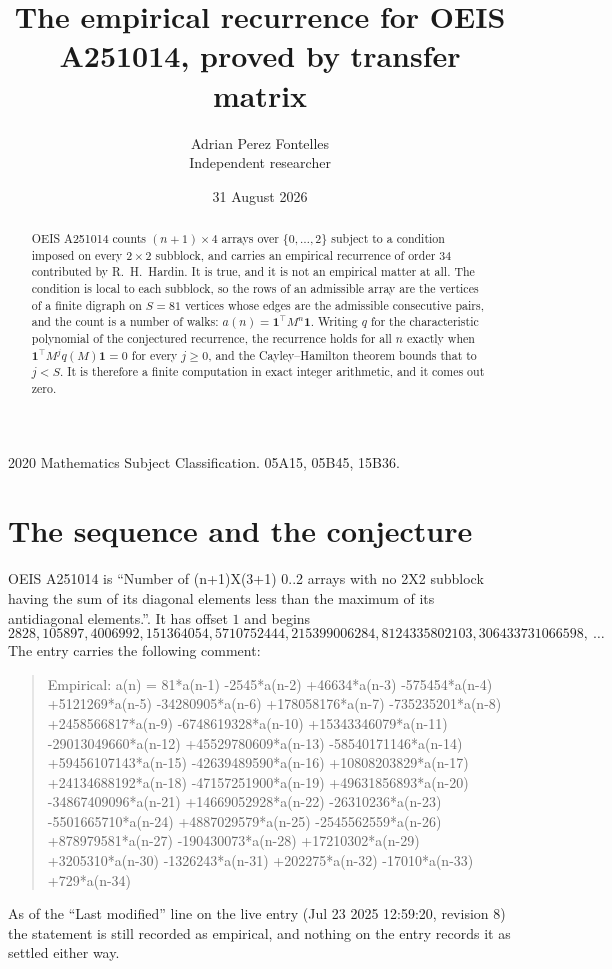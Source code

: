 \documentclass[11pt,a4paper]{article}
\title{The empirical recurrence for OEIS A251014, proved by transfer matrix}
\author{Adrian Perez Fontelles\\ \small Independent researcher}
\date{31 August 2026}
\theoremstyle{plain}
\theoremstyle{definition}
\begin{document}
\maketitle

\begin{abstract}
OEIS A251014 counts $(n+1)\times4$ arrays over $\{0,\dots,2\}$ subject to a condition imposed on
every $2\times2$ subblock, and carries an empirical recurrence of order $34$ contributed
by R.~H.~Hardin. It is true, and it is not an empirical matter at all. The condition is local
to each subblock, so the rows of an admissible array are the vertices of a finite digraph
on $S=81$ vertices whose edges are the admissible consecutive pairs, and the count is a
number of walks: $a(n)=\mathbf{1}^{\!\top}M^{n}\mathbf{1}$. Writing $q$
for the characteristic polynomial of the conjectured recurrence, the recurrence holds for all
$n$ exactly when $\mathbf{1}^{\!\top}M^{j}q(M)\mathbf{1}=0$ for every $j\ge0$, and the
Cayley--Hamilton theorem bounds that to $j<S$. It is therefore a finite computation in exact
integer arithmetic, and it comes out zero.
\end{abstract}

\noindent\small 2020 Mathematics Subject Classification. 05A15, 05B45, 15B36.\normalsize

\section{The sequence and the conjecture}

OEIS A251014 is ``Number of (n+1)X(3+1) 0..2 arrays with no 2X2 subblock having the sum of its diagonal elements less than the maximum of its antidiagonal elements.''. It has offset $1$ and begins
\[
2828, 105897, 4006992, 151364054, 5710752444, 215399006284, 8124335802103, 306433731066598,\ \dots
\]
The entry carries the following comment:
\begin{quote}\small
Empirical: a(n) = 81*a(n-1) -2545*a(n-2) +46634*a(n-3) -575454*a(n-4) +5121269*a(n-5) -34280905*a(n-6) +178058176*a(n-7) -735235201*a(n-8) +2458566817*a(n-9) -6748619328*a(n-10) +15343346079*a(n-11) -29013049660*a(n-12) +45529780609*a(n-13) -58540171146*a(n-14) +59456107143*a(n-15) -42639489590*a(n-16) +10808203829*a(n-17) +24134688192*a(n-18) -47157251900*a(n-19) +49631856893*a(n-20) -34867409096*a(n-21) +14669052928*a(n-22) -26310236*a(n-23) -5501665710*a(n-24) +4887029579*a(n-25) -2545562559*a(n-26) +878979581*a(n-27) -190430073*a(n-28) +17210302*a(n-29) +3205310*a(n-30) -1326243*a(n-31) +202275*a(n-32) -17010*a(n-33) +729*a(n-34)
\end{quote}
As of the ``Last modified'' line on the live entry (Jul 23 2025 12:59:20, revision 8) the statement is
still recorded as empirical, and nothing on the entry records it as settled either way.
\end{document}
